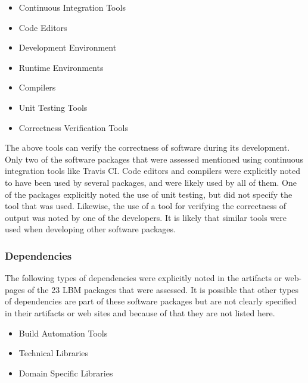 \documentclass[12pt, notitlepage]{article}
\begin{document}
\begin{singlespace}
	\begin{multicols}{2}	
		\begin{itemize}
			\item Continuous Integration Tools
			\item Code Editors
			\item Development Environment
			\item Runtime Environments
			\item Compilers
			\item Unit Testing Tools
			\item Correctness Verification Tools
		\end{itemize}
	\end{multicols}
\end{singlespace}

The above tools can verify the correctness of software during its development. Only two of the software packages that were assessed mentioned using continuous integration tools like Travis CI. Code editors and compilers were explicitly noted to have been used by several packages, and were likely used by all of them. One of the packages explicitly noted the use of unit testing, but did not specify the tool that was used. Likewise, the use of a tool for verifying the correctness of output was noted by one of the developers. It is likely that similar tools were used when developing other software packages. 

\subsubsection{Dependencies}

The following types of dependencies were explicitly noted in the artifacts or web-pages of the 23 LBM packages that were assessed. It is possible that other types of dependencies are part of these software packages but are not clearly specified in their artifacts or web sites and because of that they are not listed here.

\begin{singlespace}
	\begin{multicols}{2}	
		\begin{itemize}
			\item Build Automation Tools
			\item Technical Libraries
			\item Domain Specific Libraries
		\end{itemize}
	\end{multicols}
\end{singlespace}
\end{document}
